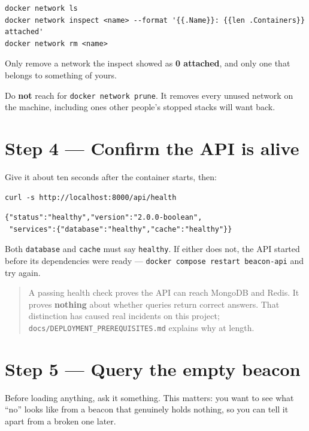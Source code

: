 \documentclass[
  10pt,
]{article}
\begin{document}
\begin{verbatim}
docker network ls
docker network inspect <name> --format '{{.Name}}: {{len .Containers}} attached'
docker network rm <name>
\end{verbatim}

Only remove a network the inspect showed as \textbf{0 attached}, and
only one that belongs to something of yours.

Do \textbf{not} reach for \texttt{docker\ network\ prune}. It removes
every unused network on the machine, including ones other people's
stopped stacks will want back.

\section{Step 4 --- Confirm the API is
alive}\label{step-4-confirm-the-api-is-alive}

Give it about ten seconds after the container starts, then:

\begin{verbatim}
curl -s http://localhost:8000/api/health
\end{verbatim}

\begin{verbatim}
{"status":"healthy","version":"2.0.0-boolean",
 "services":{"database":"healthy","cache":"healthy"}}
\end{verbatim}

Both \texttt{database} and \texttt{cache} must say \texttt{healthy}. If
either does not, the API started before its dependencies were ready ---
\texttt{docker\ compose\ restart\ beacon-api} and try again.

\begin{quote}
A passing health check proves the API can reach MongoDB and Redis. It
proves \textbf{nothing} about whether queries return correct answers.
That distinction has caused real incidents on this project;
\texttt{docs/DEPLOYMENT\_PREREQUISITES.md} explains why at length.
\end{quote}

\section{Step 5 --- Query the empty
beacon}\label{step-5-query-the-empty-beacon}

Before loading anything, ask it something. This matters: you want to see
what ``no'' looks like from a beacon that genuinely holds nothing, so
you can tell it apart from a broken one later.
\end{document}
